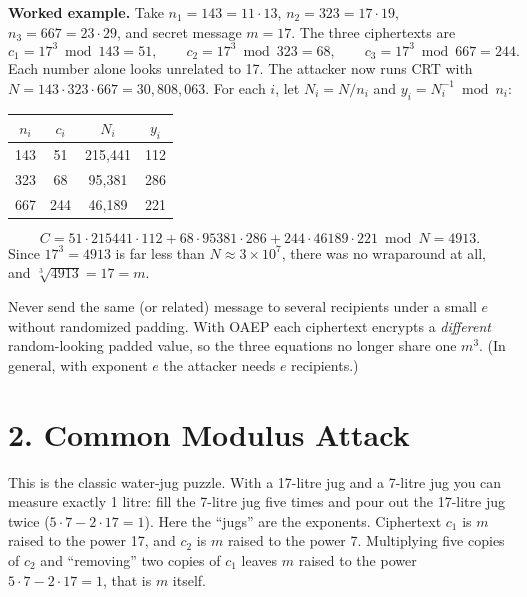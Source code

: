\documentclass[11pt]{article}
\begin{document}
\textbf{Worked example.} Take $n_1=143=11\cdot13$, $n_2=323=17\cdot19$, $n_3=667=23\cdot29$, and secret message $m=17$. The three ciphertexts are
\[
c_1=17^3\bmod143=51,\qquad c_2=17^3\bmod323=68,\qquad c_3=17^3\bmod667=244.
\]
Each number alone looks unrelated to 17. The attacker now runs CRT with $N=143\cdot323\cdot667=30{,}808{,}063$. For each $i$, let $N_i=N/n_i$ and $y_i=N_i^{-1}\bmod n_i$:
\begin{center}
\begin{tabular}{@{}cccc@{}}
\toprule
$n_i$ & $c_i$ & $N_i$ & $y_i$ \\
\midrule
143 & 51 & 215{,}441 & 112 \\
323 & 68 & 95{,}381 & 286 \\
667 & 244 & 46{,}189 & 221 \\
\bottomrule
\end{tabular}
\end{center}
\[
C = 51\cdot215441\cdot112 + 68\cdot95381\cdot286 + 244\cdot46189\cdot221 \bmod N = 4913.
\]
Since $17^3=4913$ is far less than $N\approx 3\times10^7$, there was no wraparound at all, and $\sqrt[3]{4913}=17=m$.

\begin{fixbox}
Never send the same (or related) message to several recipients under a small $e$ without randomized padding. With OAEP each ciphertext encrypts a \emph{different} random-looking padded value, so the three equations no longer share one $m^3$. (In general, with exponent $e$ the attacker needs $e$ recipients.)
\end{fixbox}

\hrulefill

\section*{2. Common Modulus Attack}

\begin{intuition}
This is the classic water-jug puzzle. With a 17-litre jug and a 7-litre jug you can measure exactly 1 litre: fill the 7-litre jug five times and pour out the 17-litre jug twice ($5\cdot7-2\cdot17=1$). Here the ``jugs'' are the exponents. Ciphertext $c_1$ is $m$ raised to the power 17, and $c_2$ is $m$ raised to the power 7. Multiplying five copies of $c_2$ and ``removing'' two copies of $c_1$ leaves $m$ raised to the power $5\cdot 7-2\cdot 17=1$, that is $m$ itself.
\end{intuition}
\end{document}
